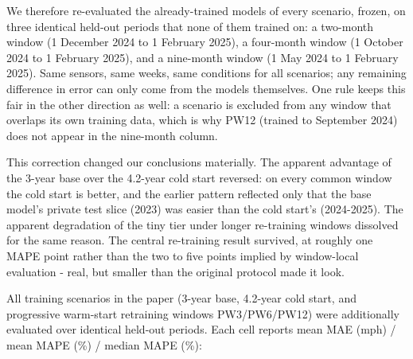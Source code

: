 \documentclass[
  10pt, ]{article}
\begin{document}
We therefore re-evaluated the already-trained models of every scenario, frozen, on three identical held-out periods that none of them trained on: a two-month window (1 December 2024 to 1 February 2025), a four-month window (1 October 2024 to 1 February 2025), and a nine-month window (1 May 2024 to 1 February 2025). Same sensors, same weeks, same conditions for all scenarios; any remaining difference in error can only come from the models themselves. One rule keeps this fair in the other direction as well: a scenario is excluded from any window that overlaps its own training data, which is why PW12 (trained to September 2024) does not appear in the nine-month column.

This correction changed our conclusions materially. The apparent advantage of the 3-year base over the 4.2-year cold start reversed: on every common window the cold start is better, and the earlier pattern reflected only that the base model's private test slice (2023) was easier than the cold start's (2024-2025). The apparent degradation of the tiny tier under longer re-training windows dissolved for the same reason. The central re-training result survived, at roughly one MAPE point rather than the two to five points implied by window-local evaluation - real, but smaller than the original protocol made it look.

All training scenarios in the paper (3-year base, 4.2-year cold start, and progressive warm-start retraining windows PW3/PW6/PW12) were additionally evaluated over identical held-out periods. Each cell reports mean MAE (mph) / mean MAPE (\%) / median MAPE (\%):
\end{document}
